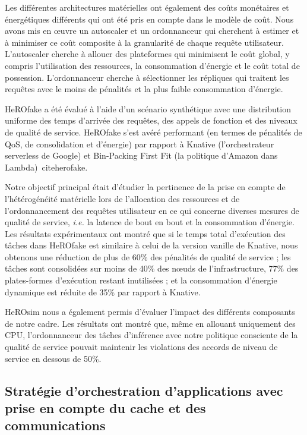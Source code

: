 Les différentes architectures matérielles ont également des coûts monétaires et énergétiques différents qui ont été pris en compte dans le modèle de coût. Nous avons mis en œuvre un autoscaler et un ordonnanceur qui cherchent à estimer et à minimiser ce coût composite à la granularité de chaque requête utilisateur. L'autoscaler cherche à allouer des plateformes qui minimisent le coût global, y compris l'utilisation des ressources, la consommation d'énergie et le coût total de possession. L'ordonnanceur cherche à sélectionner les répliques qui traitent les requêtes avec le moins de pénalités et la plus faible consommation d'énergie.

HeROfake a été évalué à l'aide d'un scénario synthétique avec une distribution uniforme des temps d'arrivée des requêtes, des appels de fonction et des niveaux de qualité de service. HeROfake s'est avéré performant (en termes de pénalités de QoS, de consolidation et d'énergie) par rapport à Knative (l'orchestrateur serverless de Google) et Bin-Packing First Fit (la politique d'Amazon dans Lambda)~cite{herofake}. 

Notre objectif principal était d'étudier la pertinence de la prise en compte de l'hétérogénéité matérielle lors de l'allocation des ressources et de l'ordonnancement des requêtes utilisateur en ce qui concerne diverses mesures de qualité de service, \textit{i.e.} la latence de bout en bout et la consommation d'énergie. Les résultats expérimentaux ont montré que si le temps total d'exécution des tâches dans HeROfake est similaire à celui de la version vanille de Knative, nous obtenons une réduction de plus de 60\% des pénalités de qualité de service ; les tâches sont consolidées sur moins de 40\% des nœuds de l'infrastructure, 77\% des plates-formes d'exécution restant inutilisées ; et la consommation d'énergie dynamique est réduite de 35\% par rapport à Knative.

HeROsim nous a également permis d'évaluer l'impact des différents composants de notre cadre. Les résultats ont montré que, même en allouant uniquement des CPU, l'ordonnanceur des tâches d'inférence avec notre politique consciente de la qualité de service pouvait maintenir les violations des accords de niveau de service en dessous de 50\%. 

\subsection{Stratégie d'orchestration d'applications avec prise en compte du cache et des communications}

